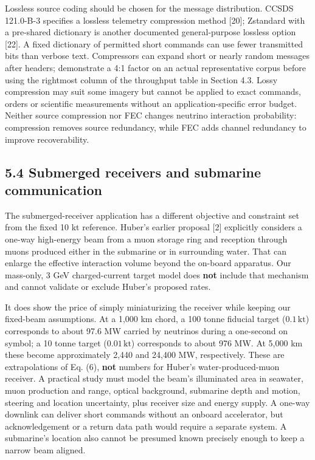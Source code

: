 \documentclass[
]{article}
\begin{document}
Lossless source coding should be chosen for the message distribution.
CCSDS 121.0-B-3 specifies a lossless telemetry compression method
{[}20{]}; Zstandard with a pre-shared dictionary is another documented
general-purpose lossless option {[}22{]}. A fixed dictionary of
permitted short commands can use fewer transmitted bits than verbose
text. Compressors can expand short or nearly random messages after
headers; demonstrate a 4:1 factor on an actual representative corpus
before using the rightmost column of the throughput table in Section
4.3. Lossy compression may suit some imagery but cannot be applied to
exact commands, orders or scientific measurements without an
application-specific error budget. Neither source compression nor FEC
changes neutrino interaction probability: compression removes source
redundancy, while FEC adds channel redundancy to improve recoverability.

\hypertarget{submerged-receivers-and-submarine-communication}{%
\subsection{5.4 Submerged receivers and submarine
communication}\label{submerged-receivers-and-submarine-communication}}

The submerged-receiver application has a different objective and
constraint set from the fixed 10 kt reference. Huber's earlier proposal
{[}2{]} explicitly considers a one-way high-energy beam from a muon
storage ring and reception through muons produced either in the
submarine or in surrounding water. That can enlarge the effective
interaction volume beyond the on-board apparatus. Our mass-only, 3 GeV
charged-current target model does \textbf{not} include that mechanism
and cannot validate or exclude Huber's proposed rates.

It does show the price of simply miniaturizing the receiver while
keeping our fixed-beam assumptions. At a 1,000 km chord, a 100 tonne
fiducial target (\(0.1\,\mathrm{kt}\)) corresponds to about 97.6 MW
carried by neutrinos during a one-second on symbol; a 10 tonne target
(\(0.01\,\mathrm{kt}\)) corresponds to about 976 MW. At 5,000 km these
become approximately 2,440 and 24,400 MW, respectively. These are
extrapolations of Eq. (6), \textbf{not} numbers for Huber's
water-produced-muon receiver. A practical study must model the beam's
illuminated area in seawater, muon production and range, optical
background, submarine depth and motion, steering and location
uncertainty, plus receiver size and energy supply. A one-way downlink
can deliver short commands without an onboard accelerator, but
acknowledgement or a return data path would require a separate system. A
submarine's location also cannot be presumed known precisely enough to
keep a narrow beam aligned.
\end{document}
